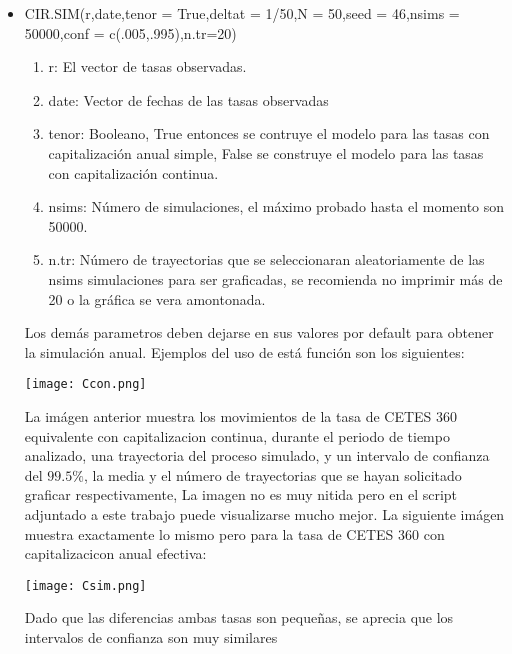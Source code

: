 \documentclass[11pt,notitlepage]{article}
\begin{document}
\begin{itemize}
    \item CIR.SIM(r,date,tenor = True,deltat = 1/50,N = 50,seed = 46,nsims = 50000,conf = c(.005,.995),n.tr=20)
            \begin{enumerate}
                \item r: El vector de tasas observadas. 
                \item date: Vector de fechas de las tasas observadas
                \item tenor: Booleano, True entonces se contruye el modelo para las tasas con capitalización anual simple, False se construye el modelo para las tasas con capitalización continua. 
                \item nsims: Número de simulaciones, el máximo probado hasta el momento son 50000.
                \item n.tr: Número de trayectorias que se seleccionaran aleatoriamente de las nsims simulaciones para ser graficadas, 
                se recomienda no imprimir más de 20 o la gráfica se vera amontonada.
            \end{enumerate}
    Los demás parametros deben dejarse en sus valores por default para obtener la simulación anual. Ejemplos del uso de está función son los siguientes: 
    \begin{center}
       \texttt{[image: Ccon.png]} 
    \end{center}
    La imágen anterior muestra los movimientos de la tasa de CETES 360 equivalente con capitalizacion continua, durante el periodo de tiempo analizado, una trayectoria del proceso simulado, y un intervalo de confianza del \(99.5\%\), la media y el número de trayectorias que se hayan solicitado graficar respectivamente, La imagen no es muy nitida pero en el script adjuntado a este trabajo puede visualizarse mucho mejor. %
    La siguiente imágen muestra exactamente lo mismo pero para la tasa de CETES 360 con capitalizacicon anual efectiva: 
    \begin{center}
       \texttt{[image: Csim.png]} 
    \end{center}
    Dado que las diferencias ambas tasas son pequeñas, se aprecia que los intervalos de confianza son muy  similares 
    

\end{itemize}
\end{document}
